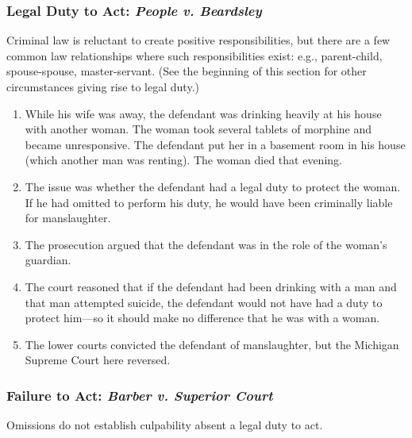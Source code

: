 \subsubsection{Legal Duty to Act: \emph{People v. Beardsley}}

Criminal law is reluctant to create positive responsibilities, but there are a 
few common law relationships where such responsibilities exist: e.g., 
parent-child, spouse-spouse, master-servant. (See the beginning of this 
section for other circumstances giving rise to legal duty.)

\begin{enumerate}
    \item While his wife was away, the defendant was drinking heavily at his 
    house with another woman. The woman took several tablets of morphine and 
    became unresponsive. The defendant put her in a basement room in his house 
    (which another man was renting). The woman died that evening.
    \item The issue was whether the defendant had a legal duty to protect the 
    woman. If he had omitted to perform his duty, he would have been 
    criminally liable for manslaughter.
    \item The prosecution argued that the defendant was in the 
    role of the woman's guardian.
    \item The court reasoned that if the defendant had been drinking with a 
    man and that man attempted suicide, the defendant would not have had a 
    duty to protect him---so it should make no difference that he was with a 
    woman.
    \item The lower courts convicted the defendant of manslaughter, but the 
    Michigan Supreme Court here reversed.
\end{enumerate}

\subsubsection{Failure to Act: \emph{Barber v. Superior Court}}

Omissions do not establish culpability absent a legal duty to act.

